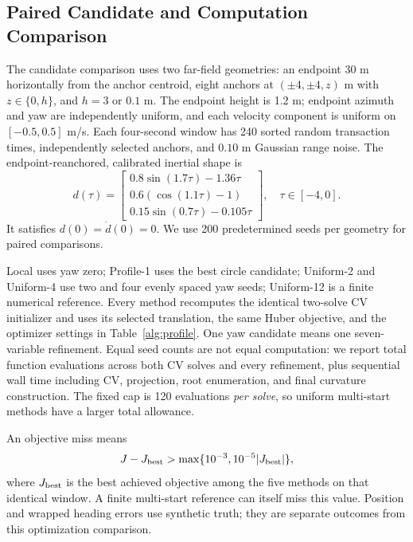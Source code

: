 \documentclass[conference,letterpaper,10pt]{IEEEtran}
\begin{document}
\subsection{Paired Candidate and Computation Comparison}
The candidate comparison uses two far-field geometries: an endpoint 30 m horizontally from the anchor centroid, eight anchors at $(\pm4,\pm4,z)$ m with $z\in\{0,h\}$, and $h=3$ or $0.1$ m. The endpoint height is 1.2 m; endpoint azimuth and yaw are independently uniform, and each velocity component is uniform on $[-0.5,0.5]$ m/s. Each four-second window has 240 sorted random transaction times, independently selected anchors, and $0.10$ m Gaussian range noise. The endpoint-reanchored, calibrated inertial shape is
\begin{equation}
 d(\tau)=\begin{bmatrix}
 0.8\sin(1.7\tau)-1.36\tau\\
 0.6(\cos(1.1\tau)-1)\\
 0.15\sin(0.7\tau)-0.105\tau
 \end{bmatrix},\quad \tau\in[-4,0].
 \label{eq:excitedshape}
\end{equation}
It satisfies $d(0)=\dot d(0)=0$. We use 200 predetermined seeds per geometry for paired comparisons.

Local uses yaw zero; Profile-1 uses the best circle candidate; Uniform-2 and Uniform-4 use two and four evenly spaced yaw seeds; Uniform-12 is a finite numerical reference. Every method recomputes the identical two-solve CV initializer and uses its selected translation, the same Huber objective, and the optimizer settings in Table~\ref{alg:profile}. One yaw candidate means one seven-variable refinement. Equal seed counts are not equal computation: we report total function evaluations across both CV solves and every refinement, plus sequential wall time including CV, projection, root enumeration, and final curvature construction. The fixed cap is 120 evaluations \emph{per solve}, so uniform multi-start methods have a larger total allowance.

An objective miss means
\begin{equation}
 J-J_{\rm best}>\max\{10^{-3},10^{-5}|J_{\rm best}|\},
 \label{eq:objectivegap}
\end{equation}
where $J_{\rm best}$ is the best achieved objective among the five methods on that identical window. A finite multi-start reference can itself miss this value. Position and wrapped heading errors use synthetic truth; they are separate outcomes from this optimization comparison.
\end{document}
